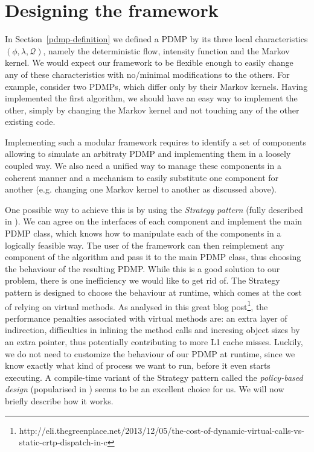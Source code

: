 \documentclass[report.tex]{subfiles}
\begin{document}
\section{Designing the framework}

In Section~\ref{pdmp-definition} we defined a PDMP by its three
local characteristics $(\phi, \lambda, \mathcal{Q})$, namely the deterministic
flow, intensity function and the Markov kernel.
We would expect our framework to be flexible enough to easily change any of
these characteristics with no/minimal modifications to the others.
For example, consider two PDMPs, which differ only by their Markov kernels.
Having implemented the first algorithm, we should have an easy way to implement
the other, simply by changing the Markov kernel and not touching any of the
other existing code.

Implementing such a modular framework requires to identify a set of components
allowing to simulate an arbitraty PDMP and implementing them in a loosely coupled way.
We also need a unified way to manage these components in a coherent manner
and a mechanism to easily substitute one component for another
(e.g. changing one Markov kernel to another as discussed above).

One possible way to achieve this is by using the \textit{Strategy pattern}
(fully described in \citet{gamma1994design}).
We can agree on the interfaces of each component and implement the main PDMP class,
which knows how to manipulate each of the components in a logically feasible way.
The user of the framework can then reimplement any component of the algorithm
and pass it to the main PDMP class, thus choosing the behaviour of the resulting
PDMP.
While this is a good solution to our problem, there is one inefficiency we would
like to get rid of.
The Strategy pattern is designed to choose the behaviour at runtime, which comes
at the cost of relying on virtual methods.
As analysed in this great blog post\footnote{
http://eli.thegreenplace.net/2013/12/05/the-cost-of-dynamic-virtual-calls-vs-static-crtp-dispatch-in-c},
the performance penalties associated with virtual methods are: an extra layer of indirection,
difficulties in inlining the method calls and incresing object sizes by an extra pointer, thus
potentially contributing to more L1 cache misses.
Luckily, we do not need to customize the behaviour of our PDMP at runtime, since
we know exactly what kind of process we want to run, before it even starts executing.
A compile-time variant of the Strategy pattern called the
\textit{policy-based design} (popularised in \citet{alexandrescu2001modern}) seems to
be an excellent choice for us. We will now briefly describe how it works.
\end{document}

